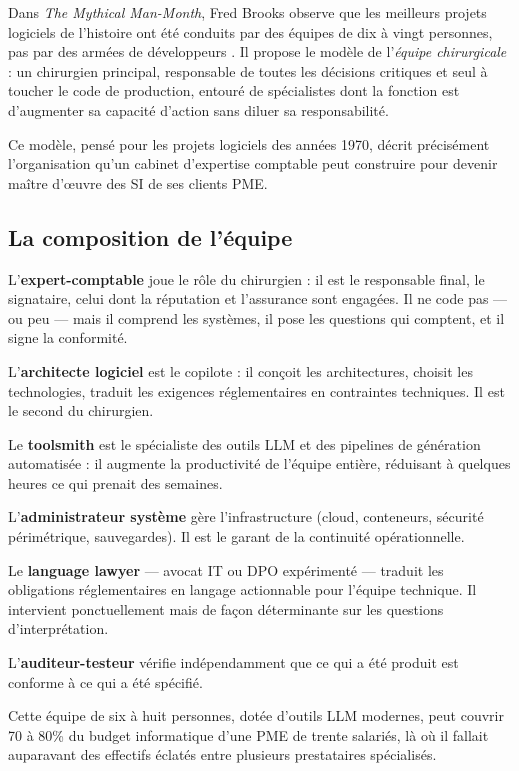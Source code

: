 \documentclass[12pt,a4paper]{article}
\begin{document}
Dans \emph{The Mythical Man-Month}, Fred Brooks observe que les meilleurs projets logiciels de l'histoire ont été conduits par des équipes de dix à vingt personnes, pas par des armées de développeurs \parencite{brooks1975}. Il propose le modèle de l'\emph{équipe chirurgicale} : un chirurgien principal, responsable de toutes les décisions critiques et seul à toucher le code de production, entouré de spécialistes dont la fonction est d'augmenter sa capacité d'action sans diluer sa responsabilité.

Ce modèle, pensé pour les projets logiciels des années 1970, décrit précisément l'organisation qu'un cabinet d'expertise comptable peut construire pour devenir maître d'œuvre des SI de ses clients PME.

\subsection{La composition de l'équipe}

L'\textbf{expert-comptable} joue le rôle du chirurgien : il est le responsable final, le signataire, celui dont la réputation et l'assurance sont engagées. Il ne code pas --- ou peu --- mais il comprend les systèmes, il pose les questions qui comptent, et il signe la conformité.

L'\textbf{architecte logiciel} est le copilote : il conçoit les architectures, choisit les technologies, traduit les exigences réglementaires en contraintes techniques. Il est le second du chirurgien.

Le \textbf{toolsmith} est le spécialiste des outils LLM et des pipelines de génération automatisée : il augmente la productivité de l'équipe entière, réduisant à quelques heures ce qui prenait des semaines.

L'\textbf{administrateur système} gère l'infrastructure (cloud, conteneurs, sécurité périmétrique, sauvegardes). Il est le garant de la continuité opérationnelle.

Le \textbf{language lawyer} --- avocat IT ou DPO expérimenté --- traduit les obligations réglementaires en langage actionnable pour l'équipe technique. Il intervient ponctuellement mais de façon déterminante sur les questions d'interprétation.

L'\textbf{auditeur-testeur} vérifie indépendamment que ce qui a été produit est conforme à ce qui a été spécifié.

Cette équipe de six à huit personnes, dotée d'outils LLM modernes, peut couvrir 70 à 80\% du budget informatique d'une PME de trente salariés, là où il fallait auparavant des effectifs éclatés entre plusieurs prestataires spécialisés.
\end{document}
